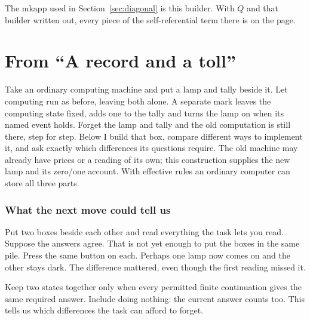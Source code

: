 \documentclass[11pt,twoside]{article}
\theoremstyle{thielethm}
\theoremstyle{thieledef}
\theoremstyle{thieledef}
\theoremstyle{thieledef}
\theoremstyle{thielethm}
\theoremstyle{thieleobs}
\theoremstyle{thielethm}
\begin{document}
The $\mathrm{mkapp}$ used in Section~\ref{sec:diagonal} is this builder. With $Q$ and that
builder written out, every piece of the self-referential term there is on the page.


\section{From ``A record and a toll''}




Take an ordinary computing machine and put a lamp and tally beside it.
Let computing run as before, leaving both alone. A separate mark leaves the
computing state fixed, adds one to the tally and turns the lamp on when its
named event holds. Forget the lamp and tally and the old computation is
still there, step for step. Below I build that box, compare different ways
to implement it, and ask exactly which differences its questions require.
The old machine may already have prices or a reading of its own; this
construction supplies the new lamp and its zero/one account. With effective
rules an ordinary computer can store all three parts.


\subsubsection*{What the next move could tell us}

Put two boxes beside each other and read everything the task lets you read.
Suppose the answers agree. That is not yet enough to put the boxes in the
same pile. Press the same button on each. Perhaps one lamp now comes on
and the other stays dark. The difference mattered, even though the first
reading missed it.

Keep two states together only when every permitted finite continuation
gives the same required answer. Include doing nothing: the current answer
counts too. This tells us which differences the task can afford to forget.
\end{document}
